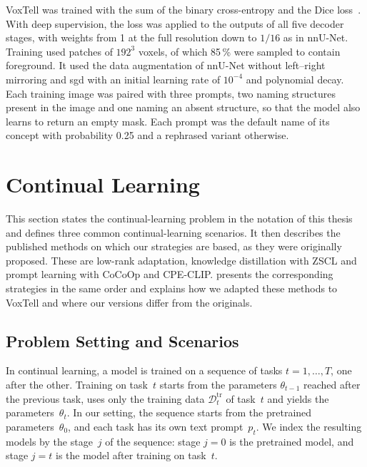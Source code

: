 VoxTell was trained with the sum of the binary cross-entropy and the Dice loss~\cite[Sec.~3, Eq.~7, Suppl.~Sec.~A]{rokuss2025voxtellfreetextpromptableuniversal}.
With deep supervision, the loss was applied to the outputs of all five decoder stages, with weights from 1 at the full resolution down to $1/16$ as in nnU-Net.
Training used patches of $192^3$ voxels, of which 85\,\% were sampled to contain foreground.
It used the data augmentation of nnU-Net without left--right mirroring and \gls{sgd} with an initial learning rate of $10^{-4}$ and polynomial decay.
Each training image was paired with three prompts, two naming structures present in the image and one naming an absent structure, so that the model also learns to return an empty mask.
Each prompt was the default name of its concept with probability 0.25 and a rephrased variant otherwise.

\section{Continual Learning}
\label{sec:bg-cl}

This section states the continual-learning problem in the notation of this thesis and defines three common continual-learning scenarios.
It then describes the published methods on which our strategies are based, as they were originally proposed.
These are low-rank adaptation, knowledge distillation with ZSCL and prompt learning with CoCoOp and CPE-CLIP.
 presents the corresponding strategies in the same order and explains how we adapted these methods to VoxTell and where our versions differ from the originals.

\subsection{Problem Setting and Scenarios}
\label{subsec:bg-cl-setting}

In continual learning, a model is trained on a sequence of tasks $t = 1, \dots, T$, one after the other.
Training on task~$t$ starts from the parameters $\theta_{t-1}$ reached after the previous task, uses only the training data $\mathcal{D}_t^{\mathrm{tr}}$ of task~$t$ and yields the parameters~$\theta_t$.
In our setting, the sequence starts from the pretrained parameters~$\theta_0$, and each task has its own text prompt~$p_t$.
We index the resulting models by the stage~$j$ of the sequence: stage $j = 0$ is the pretrained model, and stage $j = t$ is the model after training on task~$t$.

